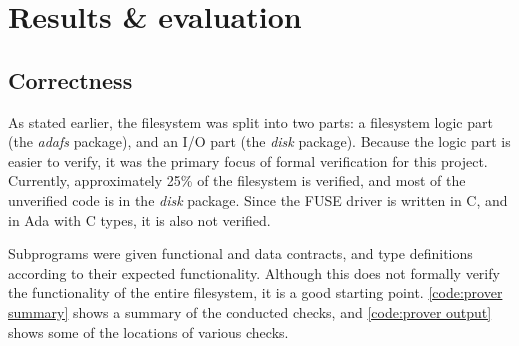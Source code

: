 \section{Results \& evaluation}
\subsection{Correctness}
As stated earlier, the filesystem was split into two parts: a filesystem logic part (the \textit{adafs} package), and an I/O part (the \textit{disk} package).
Because the logic part is easier to verify, it was the primary focus of formal verification for this project.
Currently, approximately 25\% of the filesystem is verified, and most of the unverified code is in the \textit{disk} package.
Since the FUSE driver is written in C, and in Ada with C types, it is also not verified.

Subprograms were given functional and data contracts, and type definitions according to their expected functionality.
Although this does not formally verify the functionality of the entire filesystem, it is a good starting point.
\autoref{code:prover summary} shows a summary of the conducted checks, and \autoref{code:prover output} shows some of the locations of various checks.


